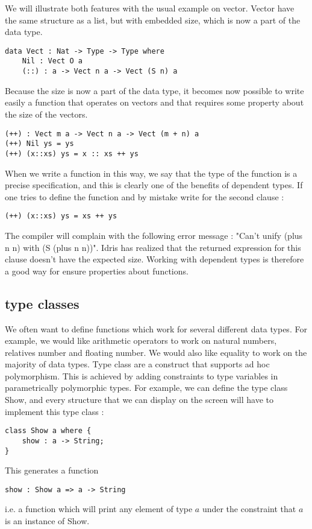 We will illustrate both features with the usual example on vector. Vector have the same structure as a list, but with embedded size, which is now a part of the data type.
\begin{lstlisting}[caption=a family of types indexed by a natural number, captionpos=b, label=lst3:haskell2]
data Vect : Nat -> Type -> Type where
	Nil : Vect O a
	(::) : a -> Vect n a -> Vect (S n) a
\end{lstlisting}

Because the size is now a part of the data type, it becomes now possible to write easily a function that operates on vectors and that requires some property about the size of the vectors.
\begin{lstlisting}[caption=a function having a dependent type, captionpos=b, label=lst4:haskell2]
(++) : Vect m a -> Vect n a -> Vect (m + n) a
(++) Nil ys = ys
(++) (x::xs) ys = x :: xs ++ ys
\end{lstlisting}

When we write a function in this way, we say that the type of the function is a precise specification, and this is clearly one of the benefits of dependent types. If one tries to define the function and by mistake write for the second clause :
\begin{lstlisting}[captionpos=b, label=lst5:haskell2]
(++) (x::xs) ys = xs ++ ys
\end{lstlisting}
The compiler will complain with the following error message : "Can't unify (plus n n) with (S (plus n n))". Idris has realized that the returned expression for this clause doesn't have the expected size. Working with dependent types is therefore a good way for ensure properties about functions. 

\subsection{type classes}
We often want to define functions which work for several different data types. For example, we would like arithmetic operators to work on natural numbers, relatives number and floating number. We would also like equality to work on the majority of data types. 
Type class are a construct that supports ad hoc polymorphism. This is achieved by adding constraints to type variables in parametrically polymorphic types.
For example, we can define the type class Show, and every structure that we can display on the screen will have to implement this type class :
\begin{lstlisting}[caption=a simple type class, captionpos=b, label=lst6:haskell2]
class Show a where {
	show : a -> String;
}
\end{lstlisting}
This generates a function 
\begin{lstlisting}[captionpos=b, label=lst7:haskell2]
show : Show a => a -> String
\end{lstlisting}
i.e. a function which will print any element of type $a$ under the constraint that $a$ is an instance of Show.

